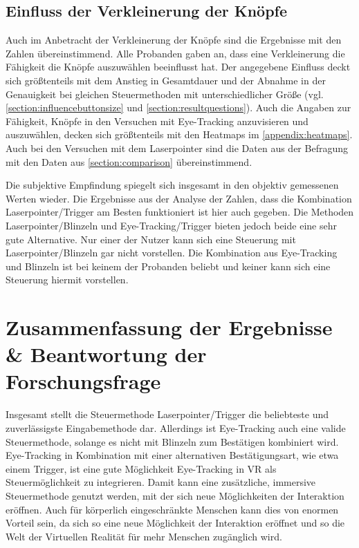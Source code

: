 \subsection{Einfluss der Verkleinerung der Knöpfe}
Auch im Anbetracht der Verkleinerung der Knöpfe sind die Ergebnisse mit den Zahlen übereinstimmend. Alle Probanden gaben an, dass eine Verkleinerung die Fähigkeit die Knöpfe auszuwählen beeinflusst hat. Der angegebene Einfluss deckt sich größtenteils mit dem Anstieg in Gesamtdauer und der Abnahme in der Genauigkeit bei gleichen Steuermethoden mit unterschiedlicher Größe (vgl. \autoref{section:influencebuttonsize} und \autoref{section:resultquestions}). Auch die Angaben zur Fähigkeit, Knöpfe in den Versuchen mit Eye-Tracking anzuvisieren und auszuwählen, decken sich größtenteils mit den Heatmaps im \autoref{appendix:heatmaps}. Auch bei den Versuchen mit dem Laserpointer sind die Daten aus der Befragung mit den Daten aus \autoref{section:comparison} übereinstimmend. 

Die subjektive Empfindung spiegelt sich insgesamt in den objektiv gemessenen Werten wieder. Die Ergebnisse aus der Analyse der Zahlen, dass die Kombination Laserpointer/Trigger am Besten funktioniert ist hier auch gegeben. Die Methoden Laserpointer/Blinzeln und Eye-Tracking/Trigger bieten jedoch beide eine sehr gute Alternative. Nur einer der Nutzer kann sich eine Steuerung mit Laserpointer/Blinzeln gar nicht vorstellen. Die Kombination aus Eye-Tracking und Blinzeln ist bei keinem der Probanden beliebt und keiner kann sich eine Steuerung hiermit vorstellen.

\section{Zusammenfassung der Ergebnisse \& Beantwortung der Forschungsfrage}
Insgesamt stellt die Steuermethode Laserpointer/Trigger die beliebteste und zuverlässigste Eingabemethode dar. Allerdings ist Eye-Tracking auch eine valide Steuermethode, solange es nicht mit Blinzeln zum Bestätigen kombiniert wird. Eye-Tracking in Kombination mit einer alternativen Bestätigungsart, wie etwa einem Trigger, ist eine gute Möglichkeit Eye-Tracking in \ac{VR} als Steuermöglichkeit zu integrieren. Damit kann eine zusätzliche, immersive Steuermethode genutzt werden, mit der sich neue Möglichkeiten der Interaktion eröffnen. Auch für körperlich eingeschränkte Menschen kann dies von enormen Vorteil sein, da sich so eine neue Möglichkeit der Interaktion eröffnet und so die Welt der Virtuellen Realität für mehr Menschen zugänglich wird.

